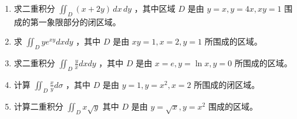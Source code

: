 \documentclass[12pt, a4paper]{article}
\begin{document}
\begin{enumerate}
    \item [10.] 求二重积分 $ \iint_{D} (x + 2y) \, dx \, dy $ ，其中区域 $D$ 是由 $ y = x, y = 4x, xy = 1 $ 围成的第一象限部分的闭区域。

    \item [11.] 求 $ \iint_{D} ye^{xy} dx dy $ ，其中 $D$ 是由 $ xy = 1, x = 2, y = 1 $ 所围成的区域。

    \item [12.] 求二重积分 $ \iint_{D}\frac{y}{x}dxdy $ ，其中 $D$ 是由 $ x=e,y=\ln x,y=0 $ 所围成的区域。

    \item [13.] 计算 $ \iint_{D} \frac{x}{y} d\sigma $ ，其中 $D$ 是由 $ y = 1, y = x^{2}, x = 2 $ 所围成的闭区域。

    \item [14.] 计算二重积分 $ \iint_{D} x\sqrt{y} $ 其中 $D$ 是由 $ y = \sqrt{x}, y = x^{2} $ 围成的区域。
\end{enumerate}
\end{document}
